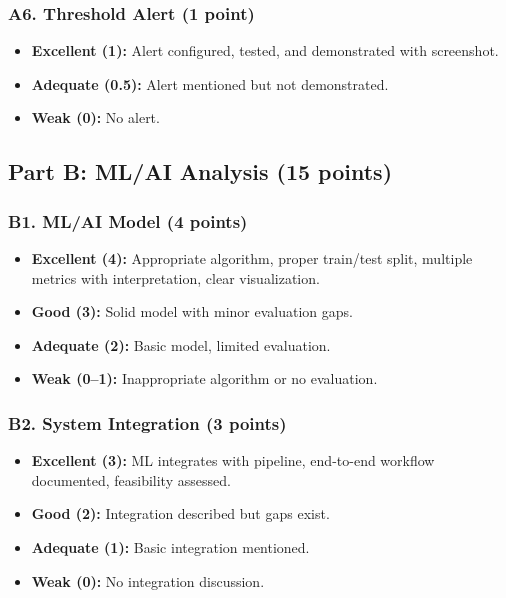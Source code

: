 \documentclass[11pt]{article}
\begin{document}
\subsubsection*{A6. Threshold Alert (1 point)}
\begin{itemize}[noitemsep]
    \item \textbf{Excellent (1):} Alert configured, tested, and demonstrated with screenshot.
    \item \textbf{Adequate (0.5):} Alert mentioned but not demonstrated.
    \item \textbf{Weak (0):} No alert.
\end{itemize}

\vspace{1em}

\subsection*{Part B: ML/AI Analysis (15 points)}

\subsubsection*{B1. ML/AI Model (4 points)}
\begin{itemize}[noitemsep]
    \item \textbf{Excellent (4):} Appropriate algorithm, proper train/test split, multiple metrics with interpretation, clear visualization.
    \item \textbf{Good (3):} Solid model with minor evaluation gaps.
    \item \textbf{Adequate (2):} Basic model, limited evaluation.
    \item \textbf{Weak (0--1):} Inappropriate algorithm or no evaluation.
\end{itemize}

\subsubsection*{B2. System Integration (3 points)}
\begin{itemize}[noitemsep]
    \item \textbf{Excellent (3):} ML integrates with pipeline, end-to-end workflow documented, feasibility assessed.
    \item \textbf{Good (2):} Integration described but gaps exist.
    \item \textbf{Adequate (1):} Basic integration mentioned.
    \item \textbf{Weak (0):} No integration discussion.
\end{itemize}
\end{document}
